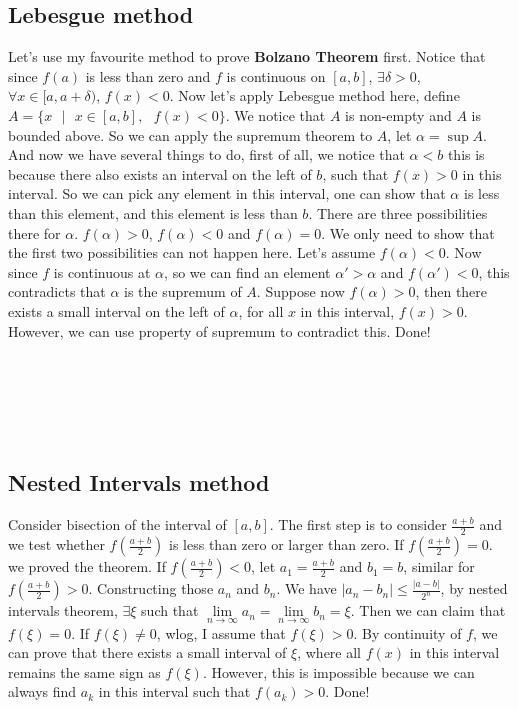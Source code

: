 \documentclass{article}
\newcommand{\tb}[1]{\textbf{#1}}
\begin{document}
\subsection*{Lebesgue method}
Let's use my favourite method to prove \tb{Bolzano Theorem} first. Notice that since $f(a)$ is less than zero and $f$ is continuous on $[a,b]$,
$\exists \delta > 0$, $\forall x \in [a, a + \delta)$, $f(x) < 0$. Now let's apply Lebesgue method here, define $A = \{x\text{ }|\text{ }x \in [a,b],\text{ }f(x) < 0\}$.
We notice that $A$ is non-empty and $A$ is bounded above. So we can apply the supremum theorem to $A$, let $\alpha = \sup A$. And now we have several things to do, first of 
all, we notice that $\alpha < b$ this is because there also exists an interval on the left of $b$, such that $f(x) > 0$ in this interval. So we can pick any 
element in this interval, one can show that $\alpha$ is less than this element, and this element is less than $b$. There are three possibilities there for $\alpha$.
$f(\alpha) > 0$, $f(\alpha) < 0$ and $f(\alpha ) = 0$. We only need to show that the first two possibilities can not happen here. Let's assume $f(\alpha) < 0$. Now since $f$ 
is continuous at $\alpha$, so we can find an element $\alpha' > \alpha$ and $f(\alpha' )< 0$, this contradicts that $\alpha$ is the supremum of $A$. Suppose now $f(\alpha) > 0$,
then there exists a small interval on the left of $\alpha$, for all $x$ in this interval, $f(x) > 0$. However, we can use property of supremum to contradict this. Done!
\\
\\
\\
\\
\\
\\
\subsection{Nested Intervals method}
Consider bisection of the interval of $[a,b]$. The first step is to consider $\frac{a+b}{2}$ and we test whether $f(\frac{a+b}{2})$ is less than zero or larger than zero. If $f(\frac{a+b}{2}) = 0$.
we proved the theorem. If $f(\frac{a+b}{2}) < 0$, let $a_1 = \frac{a+b}{2}$ and $b_1 = b$, similar for $f(\frac{a+b}{2}) > 0$. Constructing those $a_n$ and $b_n$. We have $|a_n - b_n| \leq \frac{|a-b|}{2^n}$,
by nested intervals theorem, $\exists \xi$ such that $\lim\limits_{n \to \infty}a_n = \lim\limits_{n \to \infty} b_n = \xi$. Then we can claim that $f(\xi) = 0$. If $f(\xi) \ne 0$, wlog, I assume that $f(\xi) > 0$. 
By continuity of $f$, we can prove that there exists a small interval of $\xi$, where all $f(x)$ in this interval remains the same sign as $f(\xi)$. However, this is impossible because we can always find $a_k$ 
in this interval such that $f(a_k) > 0$. Done!
\\
\\
\\
\\
\\
\end{document}

